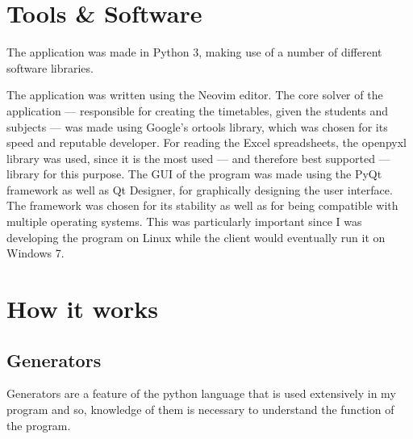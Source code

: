 \documentclass[12pt]{article}
\begin{document}
\section{Tools \& Software}
\label{sec:tools_and_software}

The application was made in Python 3, making use of a number of different software
libraries.  

The application was written using the Neovim \autocite{neovim} editor. The core solver of
the application --- responsible for creating the timetables, given the students and subjects
--- was made using Google's ortools \autocite{ortools} library, which was chosen for its
speed and reputable developer.  For reading the Excel spreadsheets, the
openpyxl\autocite{openpyxl} library was used, since it is the most used --- and therefore
best supported --- library for this purpose. The GUI of the program was made using the PyQt
\autocite{pyqt} framework as well as Qt Designer\autocite{qtdesigner}, for graphically
designing the user interface. The framework was chosen for its stability as well as for
being compatible with multiple operating systems. This was particularly important since I
was developing the program on Linux while the client would eventually run it on Windows 7.


\section{How it works}

\subsection{Generators}

Generators are a feature of the python language that is used extensively in my program and
so, knowledge of them is necessary to understand the function of the program. 
\end{document}
